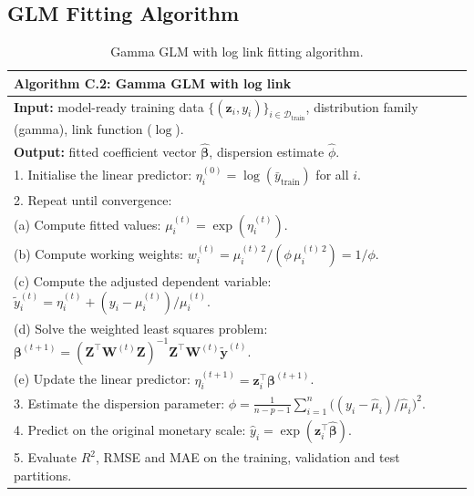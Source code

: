 \subsection{GLM Fitting Algorithm}
\label{annexure:glm_algorithm}

\begin{table}[H]
\centering
{\small
\renewcommand{\arraystretch}{1.15}
\begin{tabular}{p{}}
\toprule
\textbf{Algorithm C.2: Gamma GLM with log link} \\
\midrule
\textbf{Input:} model-ready training data
$\{(\mathbf{z}_i, y_i)\}_{i \in \mathcal{D}_{\mathrm{train}}}$,
distribution family (gamma), link function ($\log$). \\[3pt]

\textbf{Output:} fitted coefficient vector
$\widehat{\boldsymbol{\beta}}$, dispersion estimate
$\widehat{\phi}$. \\[3pt]

1. Initialise the linear predictor:
   $\eta_i^{(0)} = \log(\bar{y}_{\mathrm{train}})$ for all $i$. \\
2. Repeat until convergence: \\
\quad (a) Compute fitted values:
        $\mu_i^{(t)} = \exp(\eta_i^{(t)})$. \\
\quad (b) Compute working weights:
        $w_i^{(t)} = \mu_i^{(t)\,2} / (\phi\,\mu_i^{(t)\,2})
        = 1/\phi$. \\
\quad (c) Compute the adjusted dependent variable:
        $\tilde{y}_i^{(t)} = \eta_i^{(t)}
        + (y_i - \mu_i^{(t)}) / \mu_i^{(t)}$. \\
\quad (d) Solve the weighted least squares problem:
        $\boldsymbol{\beta}^{(t+1)}
        = (\mathbf{Z}^{\top} \mathbf{W}^{(t)} \mathbf{Z})^{-1}
          \mathbf{Z}^{\top} \mathbf{W}^{(t)}
          \tilde{\mathbf{y}}^{(t)}$. \\
\quad (e) Update the linear predictor:
        $\eta_i^{(t+1)} = \mathbf{z}_i^{\top}
        \boldsymbol{\beta}^{(t+1)}$. \\
3. Estimate the dispersion parameter:
   $\widehat{\phi} = \frac{1}{n - p - 1}
   \sum_{i=1}^{n}
   \bigl((y_i - \widehat{\mu}_i)/\widehat{\mu}_i\bigr)^{2}$. \\
4. Predict on the original monetary scale:
   $\widehat{y}_i = \exp(\mathbf{z}_i^{\top}
   \widehat{\boldsymbol{\beta}})$. \\
5. Evaluate \ensuremath{R^2}, RMSE and MAE on the training,
   validation and test partitions. \\
\bottomrule
\end{tabular}}
\caption{Gamma GLM with log link fitting algorithm.}
\label{tab:glm_algorithm_annex}
\end{table}

